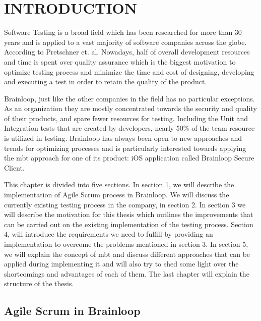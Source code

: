 \chapter{INTRODUCTION}
\label{chapter:introduction}

\par
Software Testing is a broad field which has been researched for more than 30 years and is applied to a vast majority of software companies across the globe. According to Pretschner et. al. Nowadays, half of overall development resources and time is spent over quality assurance which is the biggest motivation to optimize testing process and minimize the time and cost of designing, developing and executing a test in order to retain the quality of the product.


\par
Brainloop, just like the other companies in the field has no particular exceptions. As an organization they are mostly concentrated towards the security and quality of their products, and spare fewer resources for testing. Including the Unit and Integration tests that are created by developers, nearly 50\% of the team resource is utilized in testing. Brainloop has always been open to new approaches and trends for optimizing processes and is particularly interested towards applying the \acrlong{mbt} approach for one of its product: iOS application called Brainloop Secure Client.

\par
This chapter is divided into five sections. In section 1, we will describe the implementation of Agile Scrum process in Brainloop. We will discuss the currently existing testing process in the company, in section 2. In section 3 we will describe the motivation for this thesis which outlines the improvements that can be carried out on the existing implementation of the testing process. Section 4, will introduce the requirements we need to fulfill by providing an implementation to overcome the problems mentioned in section 3. In section 5, we will explain the concept of \acrlong{mbt} and discuss different approaches that can be applied during implementing it and will also try to shed some light over the shortcomings and advantages of each of them. The last chapter will explain the structure of the thesis.

\section{Agile Scrum in Brainloop}

